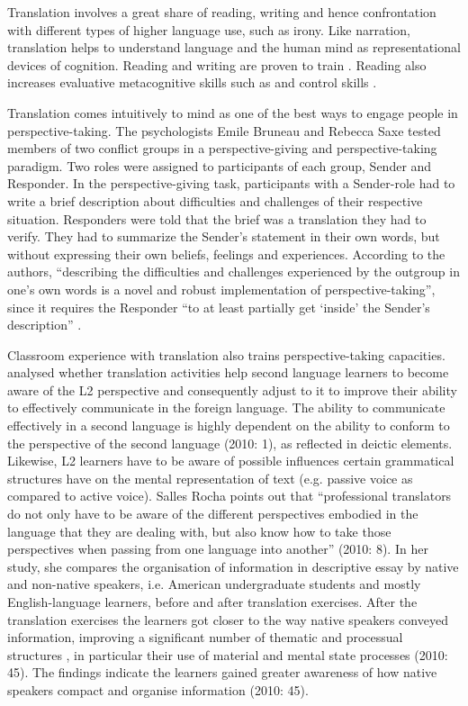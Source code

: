 \documentclass[output=paper]{LSP/langsci}
\begin{document}
Translation involves a great share of reading, writing and hence confrontation with different types of higher language use, such as irony. Like narration, translation helps to understand language and the human mind as representational devices of cognition. Reading and writing are proven to train . Reading also increases evaluative metacognitive skills such as  and control skills \citep[74]{Larkin2010}. 


Translation comes intuitively to mind as one of the best ways to engage people in perspective-taking. The psychologists Emile Bruneau and Rebecca Saxe \citeyear{Bruneau2012} tested members of two conflict groups in a perspective-giving and perspective-taking paradigm. Two roles were assigned to participants of each group, Sender and Responder. In the perspective-giving task, participants with a Sender-role had to write a brief description about difficulties and challenges of their respective situation. Responders were told that the brief was a translation they had to verify. They had to summarize the Sender's statement in their own words, but without expressing their own beliefs, feelings and experiences. According to the authors, ``describing the difficulties and challenges experienced by the outgroup in one's own words is a novel and robust implementation of perspective-taking'', since it requires the Responder ``to at least partially get `inside' the Sender's description'' \citep[856]{Bruneau2012}.


Classroom experience with translation also trains perspective-taking capacities. \citet{Salles2010} analysed whether translation activities help second language learners to become aware of the L2 perspective and consequently adjust to it to improve their ability to effectively communicate in the foreign language. The ability to communicate effectively in a second language is highly dependent on the ability to conform to the perspective of the second language (2010: 1), as reflected in deictic elements. Likewise, L2 learners have to be aware of possible influences certain grammatical structures have on the mental representation of text (e.g. passive voice as compared to active voice). Salles Rocha points out that ``professional translators do not only have to be aware of the different perspectives embodied in the language that they are dealing with, but also know how to take those perspectives when passing from one language into another'' (2010: 8). In her study, she compares the organisation of information in descriptive essay by native and non-native speakers, i.e. American undergraduate students and mostly  English-language learners, before and after translation exercises. After the translation exercises the learners got closer to the way native speakers conveyed information, improving a significant number of thematic and processual structures \citep[44]{Salles2010}, in particular their use of material and mental state processes (2010: 45). The findings indicate the learners gained greater awareness of how native speakers compact and organise information (2010: 45).
\end{document}
